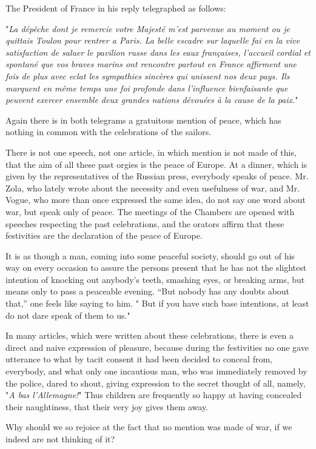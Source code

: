 \documentclass{book}
\begin{document}
The President of France in his reply telegraphed as follows:

"\emph{La dépêche dont je remercie votre Majesté m’est parvenue au moment ou je quittais Toulon pour rentrer a Paris. La belle escadre sur laquelle fai en la vive satisfaction de saluer le pavilion russe dans les eaux françaises, l’accueil cordial et spontané que vos braves marins ont rencontre partout en France affirment une fois de plus avec eclat les sympathies sincères qui unissent nos deux pays. Ils marquent en même temps une foi profonde dans l’influence bienfaisante que peuvent exercer ensemble deux grandes nations dévouées à la cause de la paix.}"

Again there is in both telegrams a gratuitous mention of peace, which has nothing in common with the celebrations of the sailors.

There is not one speech, not one article, in which mention is not made of this, that the aim of all these past orgies is the peace of Europe. At a dinner, which is given by the representatives of the Russian press, everybody speaks of peace. Mr. Zola, who lately wrote about the necessity and even usefulness of war, and Mr. Vogue, who more than once expressed the same idea, do not say one word about war, but speak only of peace. The meetings of the Chambers are opened with speeches respecting the past celebrations, and the orators affirm that these festivities are the declaration of the peace of Europe.

It is as though a man, coming into some peaceful society, should go out of his way on every occasion to assure the persons present that he has not the slightest intention of knocking out anybody’s teeth, smashing eyes, or breaking arms, but means only to pass a peaceable evening. “But nobody has any doubts about that,” one feels like saying to him. " But if you have such base intentions, at least do not dare speak of them to us."

In many articles, which were written about these celebrations, there is even a direct and naive expression of pleasure, because during the festivities no one gave utterance to what by tacit consent it had been decided to conceal from, everybody, and what only one incautious man, who was immediately removed by the police, dared to shout, giving expression to the secret thought of all, namely, "\emph{A bas l’Allemagne!}" Thus children are frequently so happy at having concealed their naughtiness, that their very joy gives them away.

Why should we so rejoice at the fact that no mention was made of war, if we indeed are not thinking of it?
\end{document}
